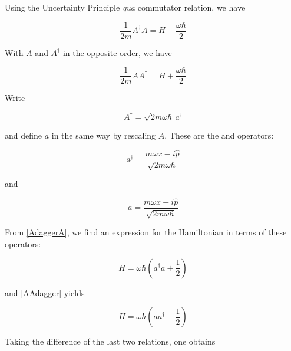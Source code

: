 Using the Uncertainty Principle \emph{qua} commutator relation, we have

\begin{equation}
\label{AdaggerA}
\frac{1}{2m}A^\dagger A = H - \frac{\omega\hbar}{2}
\end{equation}

With $A$ and $A^\dagger$ in the opposite order, we have

\begin{equation}
\label{AAdagger}
\frac{1}{2m}A A^\dagger = H + \frac{\omega\hbar}{2}
\end{equation}

Write

\begin{equation}
\label{hohamiltonian_number_operator}
A^\dagger = \sqrt{2m\omega\hbar}\, a^\dagger
\end{equation}

and define $a$ in the same way by rescaling  $A$.
These are the   and  operators:

\begin{equation}
\label{creation_op}
a^\dagger = \frac{m\omega x - i\hat p}{\sqrt{2m\omega\hbar}}
\end{equation}

and

\begin{equation}
\label{annihilation_op}
a = \frac{m\omega x + i\hat p}{\sqrt{2m\omega\hbar}}
\end{equation}

From \eqref{AdaggerA}, we find an expression for the Hamiltonian
in terms of these operators:


\begin{equation}
\label{hfactorplus}
H = \omega\hbar\left(a^\dagger a +  \frac{1}{2}\right)
\end{equation}

and \eqref{AAdagger} yields

\begin{equation}
\label{hfactorminus}
H = \omega\hbar\left(a a^\dagger -  \frac{1}{2}\right)
\end{equation}

Taking the difference of the last two relations, one obtains

